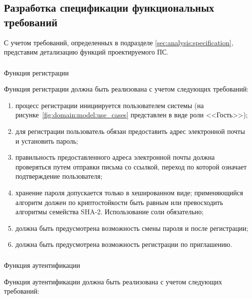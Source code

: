 \subsection{Разработка спецификации функциональных требований}
\label{sec:domain:specification}

С учетом требований, определенных в подразделе \ref{sec:analysis:specification}, представим детализацию функций
проектируемого ПС.

\subsubsection{} Функция регистрации
\label{sec:domain:specification:signup}

Функция регистрации должна быть реализована с учетом следующих требований:

\begin{enumerate}
  \item процесс регистрации инициируется пользователем системы (на рисунке~\ref{fig:domain:model:use_cases}
  представлен в виде роли <<Гость>>);
	\item для регистрации пользователь обязан предоставить адрес электронной почты и установить пароль;
  \item правильность предоставленного адреса электронной почты должна проверяться путем отправки письма со ссылкой,
  переход по которой означает подтверждение пользователя;
  \item хранение пароля допускается только в хешированном виде; применяющийся алгоритм должен по криптостойкости быть
  равным или превосходить алгоритмы семейства SHA-2. Использование соли обязательно;
  \item должна быть предусмотрена возможность смены пароля и после регистрации;
  \item должна быть предусмотрена возможность регистрации по приглашению.
\end{enumerate}

\subsubsection{} Функция аутентификации
\label{sec:domain:specification:authentication}

Функция аутентификации должна быть реализована с учетом следующих требований:

